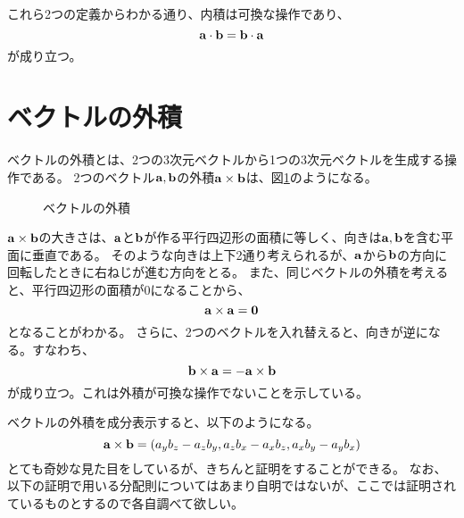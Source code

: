 \documentclass{ltjsreport}
\begin{document}
これら2つの定義からわかる通り、内積は可換な操作であり、
\begin{equation}
    \vb{a}\cdot\vb{b} = \vb{b}\cdot\vb{a}
\end{equation}
が成り立つ。

\section{ベクトルの外積}

ベクトルの外積とは、2つの3次元ベクトルから1つの3次元ベクトルを生成する操作である。
2つのベクトル$\vb{a},\vb{b}$の外積$\vb{a}\times\vb{b}$は、図\ref{ベクトルの外積}のようになる。
\begin{figure}[H]
    \centering
    \caption{ベクトルの外積}
    \label{ベクトルの外積}
\end{figure}

$\vb{a}\times\vb{b}$の大きさは、$\vb{a}$と$\vb{b}$が作る平行四辺形の面積に等しく、向きは$\vb{a},\vb{b}$を含む平面に垂直である。
そのような向きは上下2通り考えられるが、$\vb{a}$から$\vb{b}$の方向に回転したときに右ねじが進む方向をとる。
また、同じベクトルの外積を考えると、平行四辺形の面積が0になることから、
\begin{equation}
    \vb{a}\times\vb{a} = \vb{0}
\end{equation}
となることがわかる。
さらに、2つのベクトルを入れ替えると、向きが逆になる。すなわち、
\begin{equation}
    \vb{b}\times\vb{a} = -\vb{a}\times\vb{b}
\end{equation}
が成り立つ。これは外積が可換な操作でないことを示している。

ベクトルの外積を成分表示すると、以下のようになる。
\begin{equation}
    \vb{a}\times\vb{b} = (a_yb_z-a_zb_y, a_zb_x-a_xb_z, a_xb_y-a_yb_x)
\end{equation}
とても奇妙な見た目をしているが、きちんと証明をすることができる。
なお、以下の証明で用いる分配則についてはあまり自明ではないが、ここでは証明されているものとするので各自調べて欲しい。
\end{document}
